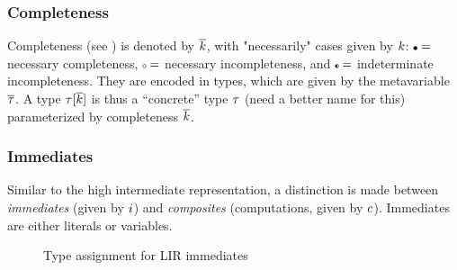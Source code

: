 \documentclass[index.tex]{subfiles}
\begin{document}
\subsubsection{Completeness}
\label{sec:lir-completeness}
Completeness (see ) is denoted by $\overline{k}$, with "necessarily" cases given
by $k$: $\CNC =$ necessary completeness, $\CNI =$ necessary incompleteness, and
$\CII =$ indeterminate incompleteness. They are encoded in types, which are given by the
metavariable $\overline{\tau}$. A type $\tau[\overline{k}]$ is thus a ``concrete''
type $\tau$ (need a better name for this) parameterized by completeness
$\overline{k}$.

\subsubsection{Immediates}
\label{sec:lir-immediates}
Similar to the high intermediate representation, a distinction is made between \emph{immediates}
(given by $i$) and \emph{composites} (computations, given by $c$). Immediates
are either literals or variables.

\begin{figure}
  \judgbox{\hasTypeCtx{\CtxVar}{\HoleCtxVar}{\SortImmVar}{\SortTypVar}}
  \caption{Type assignment for LIR immediates}
  \label{fig:lir-ta-imm}
\end{figure}
\end{document}
